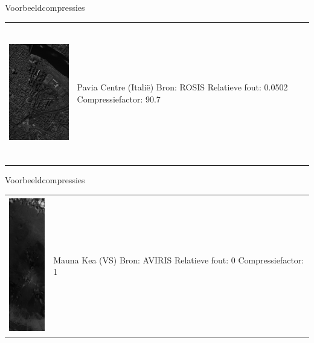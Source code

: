 \documentclass[t,12pt,dutch
\ifx\beamermode\undefined\else,\beamermode\fi
]{beamer}
\begin{document}
\begin{frame}{Voorbeeldcompressies}

\begin{table}[H]
\centering
\begin{tabular}{C{0.6\textwidth}  L{0.4\textwidth}}
\includegraphics[height=6cm]{images/example_compression_Pavia_Centre_0_05.png}
&
Pavia Centre (Itali\"e)\newline
Bron: ROSIS\newline
\vspace{5mm}
Relatieve fout: 0.0502
Compressiefactor: 90.7
\end{tabular}
\end{table}

\end{frame}

\begin{frame}{Voorbeeldcompressies}

\begin{table}[H]
\centering
\begin{tabular}{C{0.6\textwidth}  L{0.4\textwidth}}
\includegraphics[height=6cm]{images/mauna_kea_sum.png}
&
Mauna Kea (VS)\newline
Bron: AVIRIS\newline
\vspace{5mm}
Relatieve fout: 0
Compressiefactor: 1
\end{tabular}
\end{table}

\end{frame}
\end{document}
